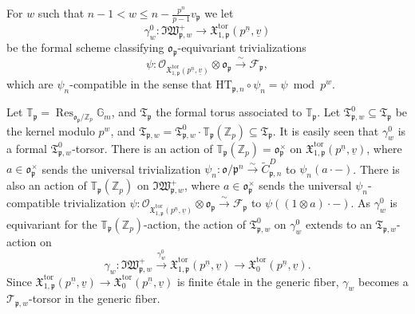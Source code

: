 \documentclass[11pt]{amsart}
\theoremstyle{definition} %
\theoremstyle{plain} %
\theoremstyle{remark} %
\newcommand{\TT}{{\mathbb T}}
\newcommand{\ZZ}{{\mathbb Z}}
\newcommand{\cF}{{\mathcal F}}
\newcommand{\cO}{{\mathcal O}}
\newcommand{\cT}{{\mathcal T}}
\newcommand{\frakI}{\mathfrak I}
\newcommand{\frakT}{\mathfrak T}
\newcommand{\frakW}{\mathfrak W}
\newcommand{\frakX}{\mathfrak X}
\newcommand{\frako}{\mathfrak o}
\newcommand{\frakp}{\mathfrak p}
\newcommand{\HT}{\mathrm{HT}}
\newcommand{\Gm}{\mathbb{G}_m} %
\newcommand{\tor}{\mathrm{tor}} %
\DeclareMathOperator\Res{Res} %
\begin{document}
For  $w$  such that $n-1<w\leqslant n-\frac{p^n}{p-1}v_\frakp$ we let 
\[
 \gamma_w^0\colon\frakI\frakW_{\frakp,w}^+\rightarrow  \frakX_{1,\frakp}^\tor(p^{\underline{n}},\underline{v})
\]
be the formal scheme classifying $\frako_{\frakp}$-equivariant  trivializations 
\[\psi\colon \cO_{\frakX_{1,\frakp}^\tor(p^{\underline{n}},\underline{v})}\otimes \frako_{\frakp} \xrightarrow{\sim} \cF_\frakp,\] 
 which are $\psi_n$-compatible in the sense that  $\HT_{\frakp,n}\circ\psi_n = \psi \bmod p^w$.
 
 
Let $\TT_\frakp = \Res_{\frako_{\frakp}/\ZZ_p}\Gm$, and $\frakT_\frakp$ the formal torus associated to $\TT_\frakp$.
Let $\frakT_{\frakp,w}^0\subseteq \frakT_\frakp$ be the kernel modulo $p^w$, and $\frakT_{\frakp,w}=\frakT_{\frakp,w}^0 \cdot \TT_\frakp(\ZZ_p) \subseteq \frakT_{\frakp}$.
It is easily seen that $\gamma_w^0$ is a formal $\frakT_{\frakp,w}^0$-torsor.
There is an action of $\TT_\frakp(\ZZ_p) = \frako_{\frakp}^\times$ on $\frakX_{1,\frakp}^\tor(p^{\underline{n}},\underline{v})$, where $a\in \frako_{\frakp}^\times$ sends the universal trivialization $\psi_n\colon \frako/\frakp^n\xrightarrow{\sim}\widetilde{C}_{\frakp,n}^{D}$ to $\psi_n(a\cdot -)$.
There is also an action of $\TT_\frakp(\ZZ_p)$ on $\frakI\frakW_{\frakp,w}^+$, where $a\in \frako_{\frakp}^\times$ sends the universal $\psi_n$-compatible trivialization $\psi\colon \cO_{\frakX_{1,\frakp}^\tor(p^{\underline{n}},\underline{v})}\otimes \frako_{\frakp} \xrightarrow{\sim} \cF_\frakp$ to $\psi((1\otimes a)\cdot -)$.
As $\gamma_w^0$ is equivariant for the $\TT_\frakp(\ZZ_p)$-action, the action of $\frakT_{\frakp,w}^0$ on $\gamma_w^0$ extends to an $\frakT_{\frakp,w}$-action   on 
\[\gamma_w\colon \frakI\frakW_{\frakp,w}^+ \xrightarrow{\gamma_w^0}   \frakX_{1,\frakp}^\tor(p^{\underline{n}},\underline{v}) \rightarrow \frakX_0^\tor(p^{\underline{n}},\underline{v}).\]
Since $\frakX_{1,\frakp}^\tor(p^{\underline{n}},\underline{v}) \rightarrow \frakX_0^\tor(p^{\underline{n}},\underline{v})$ is finite \'etale in the generic fiber, $\gamma_w$ becomes a $\cT_{\frakp,w}$-torsor in the generic fiber.
\end{document}
